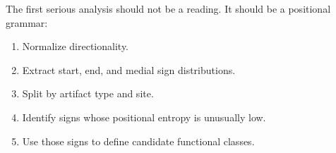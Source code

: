 The first serious analysis should not be a reading. It should be a positional grammar:

\begin{enumerate}
  \item Normalize directionality.
  \item Extract start, end, and medial sign distributions.
  \item Split by artifact type and site.
  \item Identify signs whose positional entropy is unusually low.
  \item Use those signs to define candidate functional classes.
\end{enumerate}

